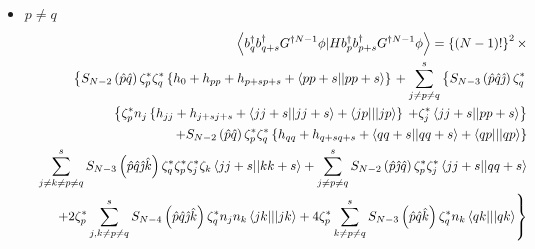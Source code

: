 \begin{itemize}
\begin{itemize}
\item $p\neq q$%
\begin{eqnarray*}
&&\left\langle b_{q}^{\dagger }b_{q+s}^{\dagger }G^{\dagger N-1}\phi
|Hb_{p}^{\dagger }b_{p+s}^{\dagger }G^{\dagger N-1}\phi \right\rangle
=\left\{ \left( N-1\right) !\right\} ^{2}\times \\
&&\left\{ S_{N-2}\left( \hat{p}\hat{q}\right) \zeta _{p}^{\ast }\zeta
_{q}^{\ast }\left\{ h_{0}+h_{pp}+h_{p+sp+s}+\left\langle
pp+s||pp+s\right\rangle \right\} \right. +\sum_{j\neq p\neq q}^{s}\left\{
S_{N-3}\left( \hat{p}\hat{q}\hat{\jmath}\right) \zeta _{q}^{\ast }\right. \\
&&\left\{ \zeta _{p}^{\ast }n_{j}\left\{ h_{jj}+h_{j+sj+s}+\left\langle
jj+s||jj+s\right\rangle +\left\langle jp|||jp\right\rangle \right\} \right.
\left. +\zeta _{j}^{\ast }\left\langle jj+s||pp+s\right\rangle \right\} \\
&&\qquad \qquad \qquad +S_{N-2}\left( \hat{p}\hat{q}\right) \zeta _{p}^{\ast
}\zeta _{q}^{\ast }\left\{ h_{qq}+h_{q+sq+s}+\left\langle
qq+s||qq+s\right\rangle +\left\langle qp|||qp\right\rangle \right\} \\
&&\sum_{j\neq k\neq p\neq q}^{s}S_{N-3}\left( \hat{p}\hat{q}\hat{\jmath}\hat{%
k}\right) \zeta _{q}^{\ast }\zeta _{p}^{\ast }\zeta _{j}^{\ast }\zeta
_{k}\left\langle jj+s||kk+s\right\rangle +\sum_{j\neq p\neq
q}^{s}S_{N-2}\left( \hat{p}\hat{\jmath}\hat{q}\right) \zeta _{p}^{\ast
}\zeta _{j}^{\ast }\left\langle jj+s||qq+s\right\rangle \\
&&\left. +2\zeta _{p}^{\ast }\sum_{j,k\neq p\neq q}^{s}S_{N-4}\left( \hat{p}%
\hat{q}\hat{\jmath}\hat{k}\right) \zeta _{q}^{\ast }n_{j}n_{k}\left\langle
jk|||jk\right\rangle +4\zeta _{p}^{\ast }\sum_{k\neq p\neq
q}^{s}S_{N-3}\left( \hat{p}\hat{q}\hat{k}\right) \zeta _{q}^{\ast
}n_{k}\left\langle qk|||qk\right\rangle \right\}
\end{eqnarray*}%
\begin{equation}
\qquad \qquad \qquad \qquad \qquad \qquad \qquad \qquad \qquad \qquad \qquad
\qquad \qquad \qquad \qquad \qquad \qquad
\end{equation}


\end{itemize}
\end{itemize}
